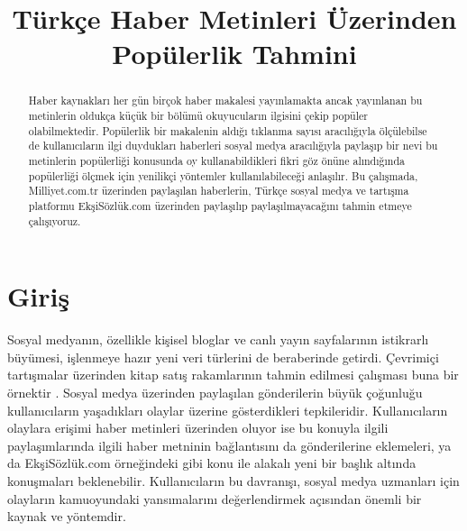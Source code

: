 \documentclass[conference]{IEEEtran}
\begin{document}
%
\title{Türkçe Haber Metinleri Üzerinden Popülerlik Tahmini}


\author{
\and
{}
\and
{}
}


\maketitle

\begin{abstract}
Haber kaynakları her gün birçok haber makalesi yayınlamakta ancak yayınlanan bu metinlerin oldukça küçük bir bölümü okuyucuların ilgisini çekip popüler olabilmektedir. Popülerlik bir makalenin aldığı tıklanma sayısı aracılığıyla ölçülebilse de kullanıcıların ilgi duydukları haberleri sosyal medya aracılığıyla paylaşıp bir nevi bu metinlerin popülerliği konusunda oy kullanabildikleri fikri göz önüne alındığında popülerliği ölçmek için yenilikçi yöntemler kullanılabileceği anlaşılır. Bu çalışmada, Milliyet.com.tr üzerinden paylaşılan haberlerin, Türkçe sosyal medya ve tartışma platformu EkşiSözlük.com üzerinden paylaşılıp paylaşılmayacağını tahmin etmeye çalışıyoruz.
\end{abstract}

\section{Giriş}

Sosyal medyanın, özellikle kişisel bloglar ve canlı yayın sayfalarının istikrarlı büyümesi, işlenmeye hazır yeni veri türlerini de beraberinde getirdi. Çevrimiçi tartışmalar üzerinden kitap satış rakamlarının tahmin edilmesi çalışması buna bir örnektir \cite{gruhl_predictive_2005}. Sosyal medya üzerinden paylaşılan gönderilerin büyük çoğunluğu kullanıcıların yaşadıkları olaylar üzerine gösterdikleri tepkileridir. Kullanıcıların olaylara erişimi haber metinleri üzerinden oluyor ise bu konuyla ilgili paylaşımlarında ilgili haber metninin bağlantısını da gönderilerine eklemeleri, ya da EkşiSözlük.com örneğindeki gibi konu ile alakalı yeni bir başlık altında konuşmaları beklenebilir. Kullanıcıların bu davranışı, sosyal medya uzmanları için olayların kamuoyundaki yansımalarını değerlendirmek açısından önemli bir kaynak ve yöntemdir.
\end{document}
